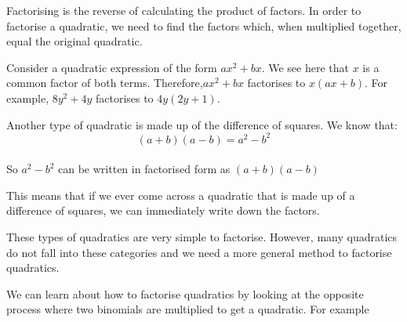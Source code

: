 Factorising is the reverse of calculating the product of factors. In order to factorise a quadratic, we need to find the factors which, when multiplied together, equal the original quadratic.\par 

Consider a quadratic expression of the form $a{x}^{2}+bx$. We see here that $x$ is a common factor of both terms. Therefore,$a{x}^{2}+bx$ factorises to $x(ax+b)$. For example, $8{y}^{2}+4y$ factorises to $4y(2y+1)$.\par 
Another type of quadratic is made up of the difference of squares. We know that:
\begin{equation*}
(a+b)(a-b)={a}^{2}-{b}^{2}
\end{equation*}
\\ 
So $a^2-b^2$ can be written in factorised form as $(a+b)(a-b)$ \par

This means that if we ever come across a quadratic that is made up of a difference of squares, we can immediately write down the factors. 


These types of quadratics are very simple to factorise. However, many quadratics do not fall into these categories and we need a more general method to factorise quadratics.
\par 
We can learn about how to factorise quadratics by looking at the opposite process where two binomials are multiplied to get a quadratic. For example

